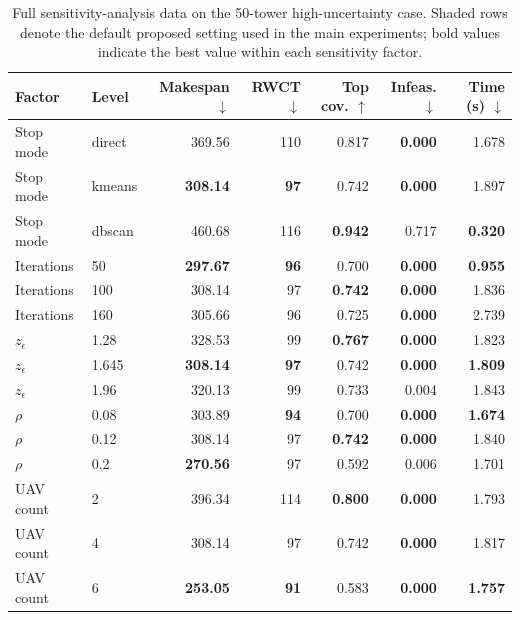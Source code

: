 \begin{table}[H]
\centering
\caption{Full sensitivity-analysis data on the 50-tower high-uncertainty case. Shaded rows denote the default proposed setting used in the main experiments; bold values indicate the best value within each sensitivity factor.}
\label{tab:sensitivity-results}
\small
\setlength{\tabcolsep}{2.7pt}
\begin{tabular}{@{}llrrrrr@{}}
\toprule
Factor & Level & Makespan $\downarrow$ & RWCT $\downarrow$ & Top cov. $\uparrow$ & Infeas. $\downarrow$ & Time (s) $\downarrow$ \\
\midrule

Stop mode & direct & 369.56 & 110 & 0.817 & \textbf{0.000} & 1.678 \\
\rowcolor{gray!10}
Stop mode & kmeans & \textbf{308.14} & \textbf{97} & 0.742 & \textbf{0.000} & 1.897 \\

Stop mode & dbscan & 460.68 & 116 & \textbf{0.942} & 0.717 & \textbf{0.320} \\
\addlinespace[2pt]

Iterations & 50 & \textbf{297.67} & \textbf{96} & 0.700 & \textbf{0.000} & \textbf{0.955} \\
\rowcolor{gray!10}
Iterations & 100 & 308.14 & 97 & \textbf{0.742} & \textbf{0.000} & 1.836 \\

Iterations & 160 & 305.66 & 96 & 0.725 & \textbf{0.000} & 2.739 \\
\addlinespace[2pt]

$z_\epsilon$ & 1.28 & 328.53 & 99 & \textbf{0.767} & \textbf{0.000} & 1.823 \\
\rowcolor{gray!10}
$z_\epsilon$ & 1.645 & \textbf{308.14} & \textbf{97} & 0.742 & \textbf{0.000} & \textbf{1.809} \\

$z_\epsilon$ & 1.96 & 320.13 & 99 & 0.733 & 0.004 & 1.843 \\
\addlinespace[2pt]

$\rho$ & 0.08 & 303.89 & \textbf{94} & 0.700 & \textbf{0.000} & \textbf{1.674} \\
\rowcolor{gray!10}
$\rho$ & 0.12 & 308.14 & 97 & \textbf{0.742} & \textbf{0.000} & 1.840 \\

$\rho$ & 0.2 & \textbf{270.56} & 97 & 0.592 & 0.006 & 1.701 \\
\addlinespace[2pt]

UAV count & 2 & 396.34 & 114 & \textbf{0.800} & \textbf{0.000} & 1.793 \\
\rowcolor{gray!10}
UAV count & 4 & 308.14 & 97 & 0.742 & \textbf{0.000} & 1.817 \\

UAV count & 6 & \textbf{253.05} & \textbf{91} & 0.583 & \textbf{0.000} & \textbf{1.757} \\
\bottomrule
\end{tabular}
\end{table}
